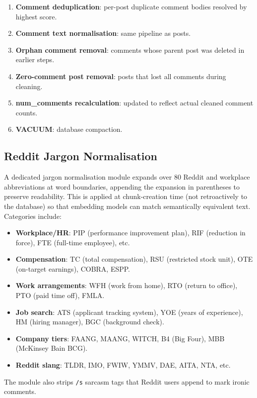 \documentclass[11pt,a4paper]{article}
\begin{document}
\begin{enumerate}[leftmargin=*]
  \item \textbf{Comment deduplication}: per-post duplicate comment bodies resolved by highest score.
  \item \textbf{Comment text normalisation}: same pipeline as posts.
  \item \textbf{Orphan comment removal}: comments whose parent post was deleted in earlier steps.
  \item \textbf{Zero-comment post removal}: posts that lost all comments during cleaning.
  \item \textbf{num\_comments recalculation}: updated to reflect actual cleaned comment counts.
  \item \textbf{VACUUM}: database compaction.
\end{enumerate}


\subsection{Reddit Jargon Normalisation}
\label{sec:jargon}

A dedicated jargon normalisation module expands over 80 Reddit and workplace abbreviations at word boundaries, appending the expansion in parentheses to preserve readability. This is applied at chunk-creation time (not retroactively to the database) so that embedding models can match semantically equivalent text. Categories include:

\begin{itemize}[leftmargin=*]
  \item \textbf{Workplace/HR}: PIP (performance improvement plan), RIF (reduction in force), FTE (full-time employee), etc.
  \item \textbf{Compensation}: TC (total compensation), RSU (restricted stock unit), OTE (on-target earnings), COBRA, ESPP.
  \item \textbf{Work arrangements}: WFH (work from home), RTO (return to office), PTO (paid time off), FMLA.
  \item \textbf{Job search}: ATS (applicant tracking system), YOE (years of experience), HM (hiring manager), BGC (background check).
  \item \textbf{Company tiers}: FAANG, MAANG, WITCH, B4 (Big Four), MBB (McKinsey Bain BCG).
  \item \textbf{Reddit slang}: TLDR, IMO, FWIW, YMMV, DAE, AITA, NTA, etc.
\end{itemize}

The module also strips \texttt{/s} sarcasm tags that Reddit users append to mark ironic comments.
\end{document}
